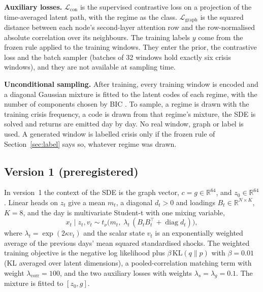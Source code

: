 \documentclass[journal]{IEEEtran}
\begin{document}
\textbf{Auxiliary losses.} $\mathcal{L}_{\mathrm{con}}$ is the supervised contrastive loss
\cite{khosla2020supcon} on a projection of the time-averaged latent path, with the regime as the class.
$\mathcal{L}_{\mathrm{graph}}$ is the squared distance between each node's second-layer attention row and the
row-normalised absolute correlation over its neighbours. The training labels $y$ come from the frozen rule
applied to the training windows. They enter the prior, the contrastive loss and the batch sampler (batches of
32 windows hold exactly six crisis windows), and they are not available at sampling time.

\textbf{Unconditional sampling.} After training, every training window is encoded and a diagonal Gaussian
mixture is fitted to the latent codes of each regime, with the number of components chosen by BIC
\cite{ghosh2020rae}. To sample, a regime is drawn with the training crisis frequency, a code is drawn from
that regime's mixture, the SDE is solved and returns are emitted day by day. No real window, graph or label is
used. A generated window is labelled crisis only if the frozen rule of Section~\ref{sec:label} says so,
whatever regime was drawn.

\subsection{Version 1 (preregistered)}
In version~1 the context of the SDE is the graph vector, $c=g\in\mathbb{R}^{64}$, and $z_0\in\mathbb{R}^{64}$.
Linear heads on $z_t$ give a mean $m_t$, a diagonal $d_t>0$ and loadings $B_t\in\mathbb{R}^{N\times K}$, $K=8$,
and the day is multivariate Student-t with one mixing variable,
\begin{equation}
x_t \mid z_t, v_t \sim t_\nu\!\big(m_t,\; \lambda_t\,(B_tB_t^{\top} + \operatorname{diag} d_t)\big),
\label{eq:emis}
\end{equation}
where $\lambda_t=\exp(2\kappa v_t)$ and the scalar state $v_t$ is an exponentially weighted average of the
previous days' mean squared standardised shocks. The weighted training objective is the negative log likelihood
plus $\beta\,\mathrm{KL}(q\|p)$ with $\beta=0.01$ (KL averaged over latent dimensions), a pooled-correlation
matching term with weight $\lambda_{\mathrm{corr}}=100$, and the two auxiliary losses with weights
$\lambda_s=\lambda_g=0.1$. The mixture is fitted to $[z_0,g]$.
\end{document}
